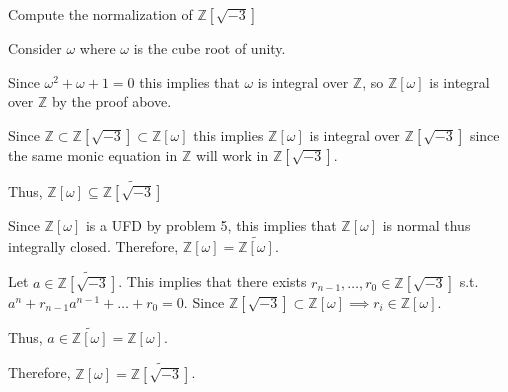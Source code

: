 \documentclass[12pt, letterpaper]{article}
\newcommand{\Z}{\mathbb{Z}}
\begin{document}
\begin{subproblem}{}
    Compute the normalization of $\Z\left[ \sqrt{-3} \right]$
\end{subproblem}
\begin{problemproof}
    Consider $\omega$ where $\omega$ is the cube root of unity.

    Since $\omega^2+\omega+1=0$ this implies that $\omega$ is integral over $\Z$, so $\Z[\omega]$ is integral over $\Z$ by the proof above.

    Since $\Z \subset \Z[\sqrt{-3}] \subset \Z[\omega]$ this implies $\Z[\omega]$ is integral over $\Z[\sqrt{-3}]$ since the same monic equation in $\Z$ will work in $\Z[\sqrt{-3}]$.

    Thus, $\Z[\omega] \subseteq \widetilde{\Z[\sqrt{-3}]}$
    
    Since $\Z[\omega]$ is a UFD by problem 5, this implies that $\Z[\omega]$ is normal thus integrally closed. Therefore, $\Z[\omega] = \widetilde{\Z[\omega]}$.

    Let $a \in \widetilde{\Z[\sqrt{-3}]}$. This implies that there exists $r_{n-1},\dots,r_0 \in \Z[\sqrt{-3}]$ s.t. $a^n+r_{n-1}a^{n-1}+\dots+r_0=0$. Since $\Z[\sqrt{-3}] \subset \Z[\omega] \implies r_i \in \Z[\omega]$.

    Thus, $a \in \widetilde{\Z[\omega]}=\Z[\omega]$.
    
    Therefore, $\Z[\omega]=\widetilde{\Z[\sqrt{-3}]}$.
\end{problemproof}
\end{document}
